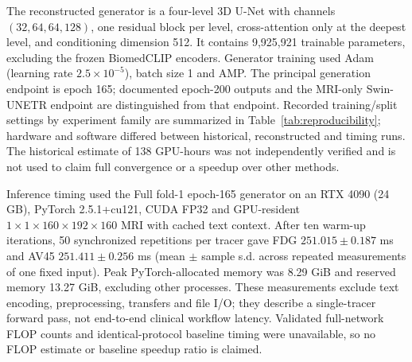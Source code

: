 The reconstructed generator is a four-level 3D U-Net with channels $(32,64,64,128)$, one residual block per level, cross-attention only at the deepest level, and conditioning dimension 512. It contains 9,925,921 trainable parameters, excluding the frozen BiomedCLIP encoders. Generator training used Adam (learning rate $2.5\times10^{-5}$), batch size 1 and AMP. The principal generation endpoint is epoch 165; documented epoch-200 outputs and the MRI-only Swin-UNETR endpoint are distinguished from that endpoint. Recorded training/split settings by experiment family are summarized in Table~\ref{tab:reproducibility}; hardware and software differed between historical, reconstructed and timing runs. The historical estimate of 138 GPU-hours was not independently verified and is not used to claim full convergence or a speedup over other methods.

Inference timing used the Full fold-1 epoch-165 generator on an RTX 4090 (24 GB), PyTorch 2.5.1+cu121, CUDA FP32 and GPU-resident $1\times1\times160\times192\times160$ MRI with cached text context. After ten warm-up iterations, 50 synchronized repetitions per tracer gave FDG $251.015\pm0.187$ ms and AV45 $251.411\pm0.256$ ms (mean $\pm$ sample s.d. across repeated measurements of one fixed input). Peak PyTorch-allocated memory was 8.29 GiB and reserved memory 13.27 GiB, excluding other processes. These measurements exclude text encoding, preprocessing, transfers and file I/O; they describe a single-tracer forward pass, not end-to-end clinical workflow latency. Validated full-network FLOP counts and identical-protocol baseline timing were unavailable, so no FLOP estimate or baseline speedup ratio is claimed.
